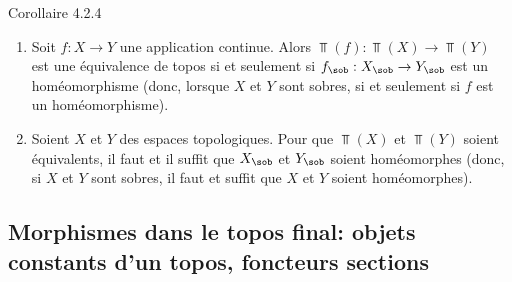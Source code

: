 \documentclass[10pt]{../fichiers-configuration-latex/smfart}
\begin{document}
\begin{enonce*}{Corollaire 4.2.4}
\begin{enumerate}
\renewcommand{\theenumi}{\alph{enumi}}
\renewcommand{\labelenumi}{\theenumi)}
\item Soit $f:X\rightarrow Y$ une application continue. Alors
$\Top(f):\Top(X)\rightarrow \Top(Y)$ est une équivalence de topos
si et seulement si $f_{\sob}:X_{\sob}\rightarrow Y_{\sob}$ est un
homéomorphisme (donc, lorsque $X$ et $Y$ sont sobres, si et
seulement si $f$ est un homéomorphisme).

\item Soient $X$ et $Y$ des espaces topologiques. Pour que $\Top(X)$
et $\Top(Y)$ soient équivalents, il faut et il suffit que
$X_{\sob}$ et $Y_{\sob}$ soient homéomorphes (donc, si $X$ et $Y$
sont sobres, il faut et suffit que $X$ et $Y$ soient
homéomorphes).
\end{enumerate}
\end{enonce*}

\subsection{Morphismes dans le topos final: objets constants d'un topos,
foncteurs sections}
\end{document}
